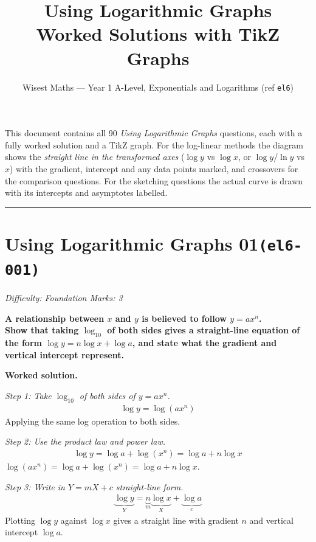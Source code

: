 \documentclass[11pt]{article}
\title{\textbf{Using Logarithmic Graphs}\\[0.3em]\large Worked Solutions with TikZ Graphs}
\author{Wisest Maths --- Year 1 A-Level, Exponentials and Logarithms (ref \texttt{el6})}
\date{}
\newcommand{\question}[1]{\par\medskip\noindent\textbf{#1}\par}
\begin{document}
\maketitle
\noindent This document contains all 90 \emph{Using Logarithmic Graphs} questions, each with a
fully worked solution and a TikZ graph. For the log-linear methods the diagram shows the \emph{straight line in the
transformed axes} (\(\log y\) vs \(\log x\), or \(\log y\)/\(\ln y\) vs \(x\)) with the gradient, intercept
and any data points marked, and crossovers for the comparison questions. For the sketching questions the actual
curve is drawn with its intercepts and asymptotes labelled.
\tableofcontents
\bigskip
\hrule

\section*{Using Logarithmic Graphs 01\quad\small\texttt{(el6-001)}}
\textit{Difficulty: Foundation \quad\textbar\quad Marks: 3}

\question{A relationship between \( x \) and \( y \) is believed to follow \( y = ax^n \). \\[3pt]  Show that taking \( \log_{10} \) of both sides gives a straight-line equation of the form \( \log y = n\log x + \log a \), and state what the gradient and vertical intercept represent.}

\textbf{Worked solution.}

\textit{Step 1: Take \( \log_{10} \) of both sides of \( y = ax^n \).}
\[\begin{gathered}
\log y = \log(ax^n)
\end{gathered}\]
Applying the same log operation to both sides.

\textit{Step 2: Use the product law and power law.}
\[\begin{gathered}
\log y = \log a + \log(x^n) = \log a + n\log x
\end{gathered}\]
\( \log(ax^n) = \log a + \log(x^n) = \log a + n\log x \).

\textit{Step 3: Write in \( Y = mX + c \) straight-line form.}
\[\begin{gathered}
\underbrace{\log y}_{Y} = \underbrace{n}_{m}\underbrace{\log x}_{X} + \underbrace{\log a}_{c}
\end{gathered}\]
Plotting \( \log y \) against \( \log x \) gives a straight line with gradient \( n \) and vertical intercept \( \log a \).
\end{document}
